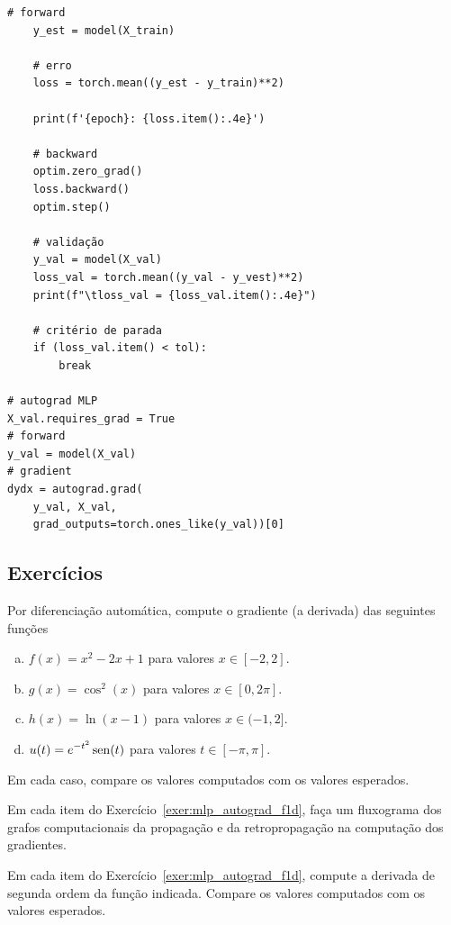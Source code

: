 \begin{ex}
\begin{lstlisting}[caption=mlp\_autograd\_apfun1d.py]
    # forward
    y_est = model(X_train)

    # erro
    loss = torch.mean((y_est - y_train)**2)

    print(f'{epoch}: {loss.item():.4e}')

    # backward
    optim.zero_grad()
    loss.backward()
    optim.step()

    # validação
    y_val = model(X_val)
    loss_val = torch.mean((y_val - y_vest)**2)
    print(f"\tloss_val = {loss_val.item():.4e}")
    
    # critério de parada
    if (loss_val.item() < tol):
        break

# autograd MLP
X_val.requires_grad = True
# forward
y_val = model(X_val)
# gradient
dydx = autograd.grad(
    y_val, X_val,
    grad_outputs=torch.ones_like(y_val))[0]
\end{lstlisting}
\end{ex}

\subsection{Exercícios}

\begin{exer}\label{exer:mlp_autograd_f1d}
  Por diferenciação automática, compute o gradiente (a derivada) das seguintes funções
  \begin{enumerate}[a)]
  \item $\displaystyle f(x) = x^2 - 2x + 1$ para valores $x\in [-2, 2]$.
  \item $\displaystyle g(x) = \cos^2(x)$ para valores $x\in [0, 2\pi]$.
  \item $\displaystyle h(x) = \ln(x-1)$ para valores $x\in (-1, 2]$.
  \item $\displaystyle u(t) = e^{-t^2}\operatorname{sen}(t)$ para valores $t\in [-\pi, \pi]$.
  \end{enumerate}
  Em cada caso, compare os valores computados com os valores esperados.
\end{exer}

\begin{exer}
  Em cada item do Exercício~\ref{exer:mlp_autograd_f1d}, faça um fluxograma dos grafos computacionais da propagação e da retropropagação na computação dos gradientes.
\end{exer}

\begin{exer}
  Em cada item do Exercício~\ref{exer:mlp_autograd_f1d}, compute a derivada de segunda ordem da função indicada. Compare os valores computados com os valores esperados.
\end{exer}

